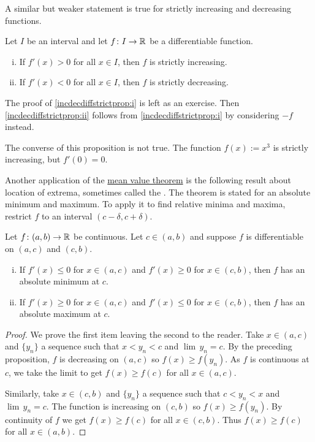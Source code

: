 A similar but weaker statement is true for strictly increasing and
decreasing functions.

\begin{prop} \label{incdecdiffstrictprop}
Let $I$ be an interval and
let $f \colon I \to {\mathbb{R}}$ be a differentiable function.
\begin{enumerate}[(i)]
\item
\label{incdecdiffstrictprop:i}
If $f'(x) > 0$ for all $x \in I$, then
$f$ is strictly increasing.
\item
\label{incdecdiffstrictprop:ii}
If $f'(x) < 0$ for all $x \in I$,
then $f$ is strictly decreasing.
\end{enumerate}
\end{prop}

The proof of
\ref{incdecdiffstrictprop:i}
is left as an exercise.
Then \ref{incdecdiffstrictprop:ii}
follows from 
\ref{incdecdiffstrictprop:i} by considering $-f$
instead.

The converse of this proposition is not true.  The function
$f(x) := x^3$ is strictly increasing, but $f'(0) = 0$.

\medskip

Another application of the \hyperref[thm:mvt]{mean value theorem} is the following result about
location of extrema, sometimes called the \emph{}.  The theorem is stated for an absolute minimum and
maximum. To apply it to find relative minima
and maxima, restrict $f$ to an interval $(c-\delta,c+\delta)$.

\begin{prop} \label{firstderminmaxtest}
Let $f \colon (a,b) \to {\mathbb{R}}$ be continuous.  Let $c \in (a,b)$
and suppose
$f$ is differentiable on $(a,c)$ and $(c,b)$.
\begin{enumerate}[(i)]
\item If $f'(x) \leq 0$ for $x \in (a,c)$ and
 $f'(x) \geq 0$ for $x \in (c,b)$, then $f$ has an absolute minimum 
at $c$.
\item If $f'(x) \geq 0$ for $x \in (a,c)$ and
 $f'(x) \leq 0$ for $x \in (c,b)$, then $f$ has an absolute maximum
at $c$.
\end{enumerate}
\end{prop}

\begin{proof}
We prove the first item leaving the second to the reader.
Take $x \in (a,c)$
and $\{ y_n\}$ a sequence such that $x < y_n < c$ and $\lim\, y_n = c$.
By the preceding proposition,
$f$ is decreasing on $(a,c)$ so $f(x) \geq f(y_n)$.
As $f$ is
continuous at $c$, we take the limit to get
$f(x) \geq f(c)$ for all $x \in (a,c)$.

Similarly, take $x \in (c,b)$
and $\{ y_n\}$ a sequence such that $c < y_n < x$ and $\lim\, y_n = c$.
The function is increasing on $(c,b)$ so $f(x) \geq f(y_n)$.
By continuity of $f$ we get
$f(x) \geq f(c)$ for all $x \in (c,b)$.  Thus $f(x) \geq f(c)$ for all
$x \in (a,b)$.
\end{proof}

